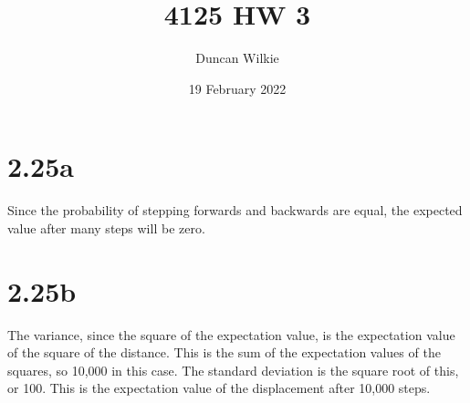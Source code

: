 \documentclass{article}
\title{4125 HW 3}
\author{Duncan Wilkie}
\date{19 February 2022}
\begin{document}
\maketitle

\section*{2.25a}
Since the probability of stepping forwards and backwards are equal, the expected value after many steps will be zero.

\section*{2.25b}
The variance, since the square of the expectation value, is the expectation value of the square of the distance. This is the sum of the expectation values of the squares, so 10,000 in this case. The standard deviation is the square root of this, or 100. This is the expectation value of the displacement after 10,000 steps.
\end{document}
